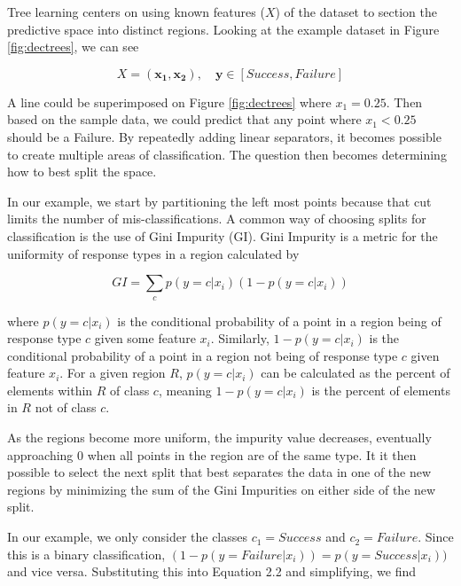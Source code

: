 Tree learning centers on using known features ($X$) of the dataset to section the predictive space into distinct regions. Looking at the example dataset in Figure \ref{fig:dectrees}, we can see 

$$X = (\bm{x_{1}}, \bm{x_{2}}), \quad \bm{y}\in[Success, Failure]$$

A line could be superimposed on Figure \ref{fig:dectrees} where $x_{1} = 0.25$. Then based on the sample data, we could predict that any point where $x_{1} < 0.25$ should be a Failure. By repeatedly adding linear separators, it becomes possible to create multiple areas of classification. The question then becomes determining how to best split the space.

In our example, we start by partitioning the left most points because that cut limits the number of mis-classifications. A common way of choosing splits for classification is the use of Gini Impurity (GI). Gini Impurity is a metric for the uniformity of response types in a region calculated by


\begin{equation}
    GI = \sum_{c} p(y = c | x_{i})(1 - p(y = c | x_{i}))
\end{equation}

where $p(y = c | x_{i})$ is the conditional probability of a point in a region being of response type $c$ given some feature $x_{i}$. Similarly, $1 - p(y = c | x_{i})$ is the conditional probability of a point in a region not being of response type $c$ given feature $x_{i}$. For a given region $R$, $p(y = c | x_{i})$ can be calculated as the percent of elements within $R$ of class $c$, meaning $1 - p(y = c | x_{i})$ is the percent of elements in $R$ not of class $c$.

As the regions become more uniform, the impurity value decreases, eventually approaching 0 when all points in the region are of the same type. It it then possible to select the next split that best separates the data in one of the new regions by minimizing the sum of the Gini Impurities on either side of the new split.

In our example, we only consider the classes $c_{1} = Success$ and $c_{2} = Failure$. Since this is a binary classification, $(1 - p(y = Failure | x_{i})) = p(y = Success | x_{i}))$ and vice versa. Substituting this into Equation 2.2 and simplifying, we find

